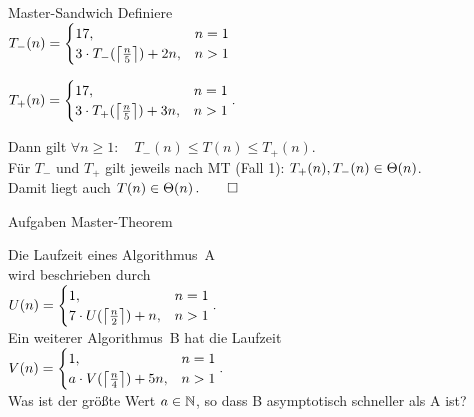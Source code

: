 \begin{frame}{Master-Sandwich}
	\solutionheading 
	 Definiere\\ \begin{math}
		T_-(n) = 
		\begin{cases}
		17,                           			   &n = 1 \\
		3 \cdot T_-(\left\lceil\frac{n}{5}\right\rceil) + 2n,  &  n > 1
		\end{cases}
		\end{math}
		
		\begin{math}
		T_+(n) = 
		\begin{cases}
		17,                           			   &n = 1 \\
		3 \cdot T_+(\left\lceil\frac{n}{5}\right\rceil) + 3n ,  &  n > 1
		\end{cases}.
		\end{math}
		
		\medskip
		Dann gilt $\forall n \geq 1: \quad T_-(n) \leq T(n) \leq T_+(n)$.\\
		Für $T_-$ und $T_+$ gilt jeweils nach MT (Fall 1): \quad $ T_+(n), T_-(n) \in \Theta\!\left(n\right)$.\\
		Damit liegt auch $T(n) \in \Theta\!\left(n\right). \qed$
		
\end{frame}

\begin{frame}{Aufgaben Master-Theorem}
	\begin{wrapfigure}{r}[-.2\baselineskip]{.38\textwidth}
		\fbox{\mastertheoreminder}
	\end{wrapfigure}
	Die Laufzeit eines Algorithmus~A \\
	wird beschrieben durch \\ \smallskip
	\begin{math}
	U(n) = 
	\begin{cases}
	1,                           			   &n = 1 \\
	7 \cdot U(\left\lceil\frac{n}{2}\right\rceil) + n,  &  n > 1
	\end{cases}.
	\end{math} \\ \bigskip
	Ein weiterer Algorithmus~B hat die Laufzeit \\ \smallskip
	\begin{math}
	V(n) = 
	\begin{cases}
	1,                            				& n = 1 \\
	a \cdot V(\left\lceil\frac{n}{4}\right\rceil) + 5n,  & n > 1
	\end{cases}.
	\end{math} \\ \bigskip
	Was ist der größte Wert $a \in \mathbb{N}$, so dass B asymptotisch schneller als A ist?
\end{frame}

